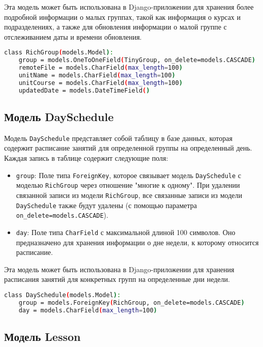 Эта модель может быть использована в Django-приложении
для хранения более подробной информации о малых группах,
такой как информация о курсах и подразделениях,
а также для обновления информации о малой группе с отслеживанием даты
и времени обновления.

\begin{lstlisting}[language=bash]
class RichGroup(models.Model):
    group = models.OneToOneField(TinyGroup, on_delete=models.CASCADE)
    remoteFile = models.CharField(max_length=100)
    unitName = models.CharField(max_length=100)
    unitCourse = models.CharField(max_length=100)
    updatedDate = models.DateTimeField()
\end{lstlisting}


\subsection{Модель DaySchedule}

Модель \texttt{DaySchedule} представляет собой таблицу в базе данных,
которая содержит расписание занятий
для определенной группы на определенный день.
Каждая запись в таблице содержит следующие поля:

\begin{itemize}
    \item \texttt{group}: Поле типа \texttt{ForeignKey},
		которое связывает модель \texttt{DaySchedule}
		с моделью \texttt{RichGroup} через отношение "многие к одному".
		При удалении связанной записи из модели \texttt{RichGroup},
		все связанные записи из модели \texttt{DaySchedule}
		также будут удалены
		(с помощью параметра \texttt{on\_delete=models.CASCADE}).
    \item \texttt{day}: Поле типа \texttt{CharField}
		с максимальной длиной 100 символов.
		Оно предназначено для хранения информации о дне недели,
		к которому относится расписание.
\end{itemize}

Эта модель может быть использована в Django-приложении
для хранения расписания занятий для конкретных групп
на определенные дни недели.

\begin{lstlisting}[language=bash]
class DaySchedule(models.Model):
    group = models.ForeignKey(RichGroup, on_delete=models.CASCADE)
    day = models.CharField(max_length=100)
\end{lstlisting}

\subsection{Модель Lesson}

